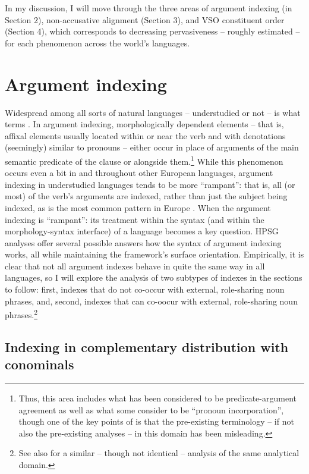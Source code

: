 \documentclass[output=paper
	        ,collection
	        ,collectionchapter
 	        ,biblatex
                ,babelshorthands
                ,newtxmath
                ,draftmode
                ,colorlinks, citecolor=brown
]{langscibook}
\begin{document}
In my discussion, I will move through the three areas of argument indexing (in Section 2), non-accusative alignment (Section 3), and VSO constituent order (Section 4), which corresponds to decreasing pervasiveness -- roughly estimated -- for each phenomenon across the world's languages.       

\section{Argument indexing}

Widespread among all sorts of natural languages -- understudied or not -- is what \citet{haspelmath13} terms . In argument indexing, morphologically dependent elements -- that is, affixal elements usually located within or near the verb and with denotations (seemingly) similar to pronouns -- either occur in place of arguments of the main semantic predicate of the clause or alongside them.\footnote{Thus, this area includes what has been considered to be predicate-argument agreement as well as what some consider to be ``pronoun incorporation'', though one of the key points of \citet{haspelmath13} is that the pre-existing terminology -- if not also the pre-existing analyses -- in this domain has been misleading.} While this phenomenon occurs even a bit in  and throughout other European languages, argument indexing in understudied languages tends to be more ``rampant'': that is, all (or most) of the verb's arguments are indexed, rather than just the subject being indexed, as is the most common pattern in Europe \citep{siewierskaWALSvpm}. When the argument indexing is ``rampant'': its treatment within the syntax (and within the morphology-syntax interface) of a language becomes a key question. HPSG analyses offer several possible answers how the syntax of argument indexing works, all while maintaining the framework's surface orientation. Empirically, it is clear that not all argument indexes behave in quite the same way in all languages, so I will explore the analysis of two subtypes of indexes in the sections to follow: first, indexes that do not co-occur with external, role-sharing noun phrases, and, second, indexes that can co-oocur with external, role-sharing noun phrases.\footnote{See also \citet{saleem10} for a similar -- though not identical -- analysis of the same analytical domain.}   

\subsection{Indexing in complementary distribution with conominals} \label{pro-indexes}
\end{document}
